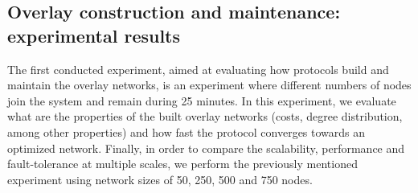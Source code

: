 \begin{table} \label{table:proto_test_params}
    \caption{Protocol test configuration parameters}
\end{table}

\subsection{Overlay construction and maintenance: experimental results}

The first conducted experiment, aimed at evaluating how protocols build and maintain the overlay networks, is an experiment where different numbers of nodes join the system and remain during 25 minutes. In this experiment, we evaluate what are the properties of the built overlay networks (costs, degree distribution, among other properties) and how fast the protocol converges towards an optimized network. Finally, in order to compare the scalability, performance and fault-tolerance at multiple scales, we perform the previously mentioned experiment using network sizes of 50, 250, 500 and 750 nodes.

